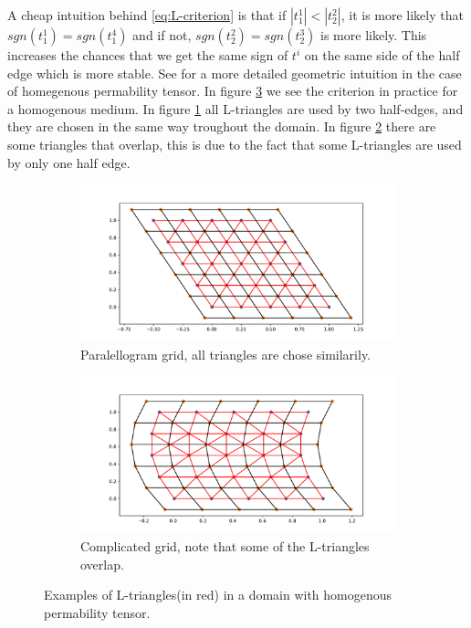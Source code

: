 \documentclass[../Main/main.tex]{subfiles}
\begin{document}
A cheap intuition behind \eqref{eq:L-criterion} is that if $|t_1^1|<|t_2^2|$, it is more likely that $sgn(t_1^1) = sgn(t_1^4)$ and if not, $sgn(t_2^2) = sgn(t_2^3)$ is more likely. This increases the chances that we get the same sign of $t^i$ on the same side of the half edge which is more stable.  See \cite{https://doi.org/10.1002/fld.1926} for a more detailed geometric intuition in the case of homegenous permability tensor. In figure \ref{fig:L-triangles} we see the criterion in practice for a homogenous medium. In figure \ref{fig:paralellogram-L} all L-triangles are used by two half-edges, and they are chosen in the same way troughout the domain. In figure \ref{fig:complicated-L} there are some triangles that overlap, this is due to the fact that some L-triangles are used by only one half edge.
\begin{figure}[H]
	\centering
	\begin{subfigure}[b]{0.8\textwidth}
		\centering
		\includegraphics[width=\textwidth]{L-triangles_paralellogram.pdf}
		\caption{Paralellogram grid, all triangles are chose similarily.}
		\label{fig:paralellogram-L}
	\end{subfigure}
	\hfill
	\begin{subfigure}[b]{0.8\textwidth}
		\centering
		\includegraphics[width=\textwidth]{L-triangles_complex.pdf}
		\caption{Complicated grid, note that some of the L-triangles overlap.}
		\label{fig:complicated-L}
	\end{subfigure}
	\caption{Examples of L-triangles(in red) in a domain with homogenous permability tensor.}
	\label{fig:L-triangles}
\end{figure}
\end{document}
